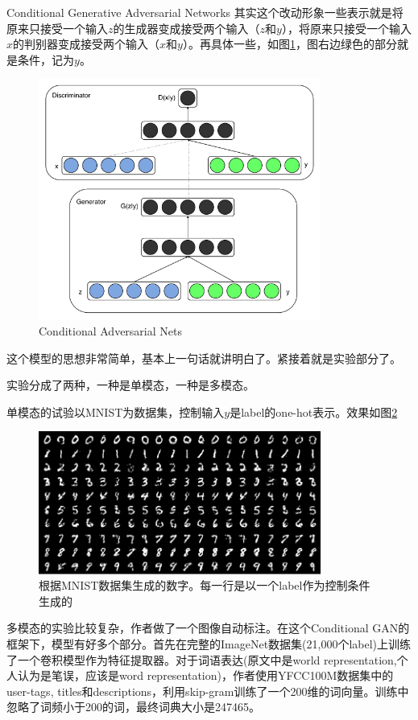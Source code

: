 \documentclass{ctexart}
\begin{document}
\begin{section}{Conditional Generative Adversarial Networks\cite{mirza2014conditional}}
		其实这个改动形象一些表示就是将原来只接受一个输入$z$的生成器变成接受两个输入（$z$和$y$），将原来只接受一个输入$x$的判别器变成接受两个输入（$x$和$y$）。再具体一些，如图\ref{fig:cgan-ori-struct}，图右边绿色的部分就是条件，记为$y$。
		
		\begin{figure}
			\centering
			\includegraphics[width=25em]{figures/CGAN-origin-structure.png}
			\caption{Conditional Adversarial Nets}
			\label{fig:cgan-ori-struct}
		\end{figure}
	
		
		这个模型的思想非常简单，基本上一句话就讲明白了。紧接着就是实验部分了。
		
		实验分成了两种，一种是单模态，一种是多模态。
		
		单模态的试验以MNIST为数据集，控制输入$y$是label的one-hot表示。效果如图\ref{fig:cgan-exp-mnist}
		
		\begin{figure}
			\centering
			\includegraphics[width=25em]{figures/CGAN-experiment-mnist.png}
			\caption{根据MNIST数据集生成的数字。每一行是以一个label作为控制条件生成的}
			\label{fig:cgan-exp-mnist}
		\end{figure}
	
		多模态的实验比较复杂，作者做了一个图像自动标注。在这个Conditional GAN的框架下，模型有好多个部分。首先在完整的ImageNet数据集(21,000个label)上训练了一个卷积模型作为特征提取器。对于词语表达(原文中是world representation,个人认为是笔误，应该是word representation)，作者使用YFCC100M数据集中的user-tags, titles和descriptions，利用skip-gram训练了一个200维的词向量。训练中忽略了词频小于200的词，最终词典大小是247465。
		

\end{section}
\end{document}

